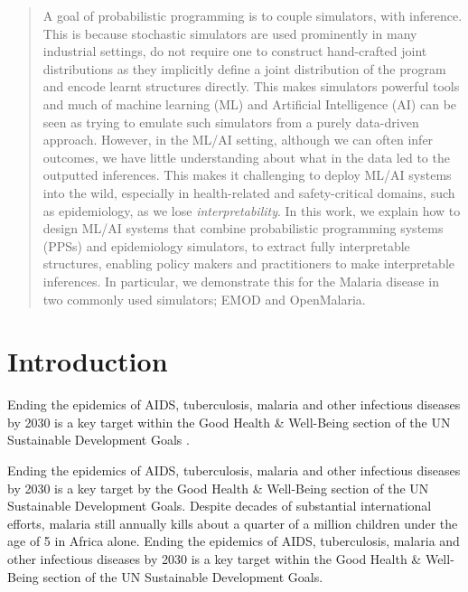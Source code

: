 \documentclass{article}
\begin{document}
\printAffiliationsAndNotice{\icmlEqualContribution} %

\begin{abstract}

A goal of probabilistic programming is to couple simulators, with inference. This is 
because stochastic simulators are used prominently in many industrial settings,
do not require one to construct hand-crafted joint distributions as they implicitly 
define a joint distribution of the program and encode learnt structures 
directly. This makes simulators powerful tools and much of machine learning (ML) and 
Artificial Intelligence (AI)
can be seen as trying to emulate such simulators from a purely data-driven approach.
However, in the 
ML/AI setting, although we can often infer outcomes, we have little understanding about what 
in the data led to the outputted inferences. 
This makes it challenging to deploy ML/AI systems into the wild, especially in health-related and safety-critical domains, such
as epidemiology, as we lose \emph{interpretability}. 
In this work, we explain how to design ML/AI systems that combine
probabilistic programming systems (PPSs) and epidemiology simulators, to extract
fully interpretable structures, enabling policy makers 
and practitioners to make interpretable inferences. 
In particular, we demonstrate this for the Malaria disease in two commonly used simulators; EMOD and OpenMalaria.
\end{abstract}

\section{Introduction}
Ending the epidemics of AIDS, tuberculosis, malaria and other infectious diseases by 2030 is a key target within the Good Health \& Well-Being section of the UN Sustainable Development Goals \cite{refugees_2030_nodate}\cite{un_sustainable_2018}. 

Ending the epidemics of AIDS, tuberculosis, malaria and other infectious diseases by 2030 is a key target by the Good Health \& Well-Being section of the UN Sustainable Development Goals. 
Despite decades of substantial international efforts, malaria still annually kills about a quarter of a million children under the age of 5 in Africa alone.
Ending the epidemics of AIDS, tuberculosis, malaria and other infectious diseases by 2030 is a key target within the Good Health \& Well-Being section of the UN Sustainable Development Goals\cite{}. 
\end{document}
